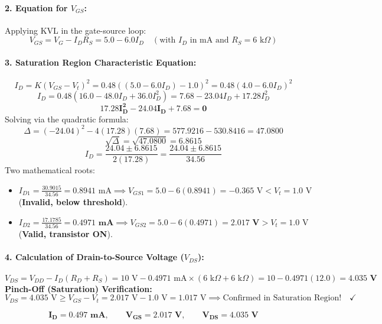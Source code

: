 \documentclass[11pt,a4paper,oneside]{book}
\begin{document}
\paragraph{2. Equation for $V_{GS}$:}
Applying KVL in the gate-source loop:
\[
V_{GS} = V_G - I_D R_S = 5.0 - 6.0 I_D \quad (\text{with } I_D \text{ in mA and } R_S = 6\text{ k}\Omega)
\]

\paragraph{3. Saturation Region Characteristic Equation:}
\[
I_D = K(V_{GS} - V_t)^2 = 0.48 \left( (5.0 - 6.0 I_D) - 1.0 \right)^2 = 0.48 (4.0 - 6.0 I_D)^2
\]
\[
I_D = 0.48 (16.0 - 48.0 I_D + 36.0 I_D^2) = 7.68 - 23.04 I_D + 17.28 I_D^2
\]
\[
\mathbf{17.28 I_D^2 - 24.04 I_D + 7.68 = 0}
\]
Solving via the quadratic formula:
\[
\Delta = (-24.04)^2 - 4(17.28)(7.68) = 577.9216 - 530.8416 = 47.0800
\]
\[
\sqrt{\Delta} = \sqrt{47.0800} = \mathbf{6.8615}
\]
\[
I_D = \frac{24.04 \pm 6.8615}{2(17.28)} = \frac{24.04 \pm 6.8615}{34.56}
\]
Two mathematical roots:
\begin{itemize}[leftmargin=1.5em]
  \item $I_{D1} = \frac{30.9015}{34.56} = 0.8941\text{ mA} \implies V_{GS1} = 5.0 - 6(0.8941) = -0.365\text{ V} < V_t = 1.0\text{ V}$ (\textbf{Invalid, below threshold}).
  \item $I_{D2} = \frac{17.1785}{34.56} = \mathbf{0.4971\text{ mA}} \implies V_{GS2} = 5.0 - 6(0.4971) = \mathbf{2.017\text{ V}} > V_t = 1.0\text{ V}$ (\textbf{Valid, transistor ON}).
\end{itemize}

\paragraph{4. Calculation of Drain-to-Source Voltage ($V_{DS}$):}
\[
V_{DS} = V_{DD} - I_D(R_D + R_S) = 10\text{ V} - 0.4971\text{ mA} \times (6\text{ k}\Omega + 6\text{ k}\Omega) = 10 - 0.4971(12.0) = \mathbf{4.035\text{ V}}
\]
\textbf{Pinch-Off (Saturation) Verification:}
\[
V_{DS} = 4.035\text{ V} \ge V_{GS} - V_t = 2.017\text{ V} - 1.0\text{ V} = 1.017\text{ V} \implies \text{Confirmed in Saturation Region!} \quad \checkmark
\]

\begin{answerbox}
$$\mathbf{I_D = 0.497\text{ mA}, \qquad V_{GS} = 2.017\text{ V}, \qquad V_{DS} = 4.035\text{ V}}$$
\end{answerbox}
\end{document}
